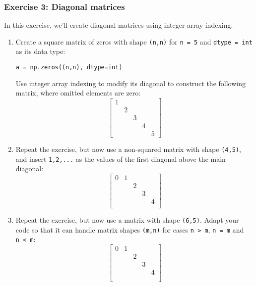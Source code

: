 \documentclass[10pt]{scrartcl}
\begin{document}
    \hypertarget{exercise-3-diagonal-matrices}{%
\subsubsection{Exercise 3: Diagonal
matrices}\label{exercise-3-diagonal-matrices}}

In this exercise, we'll create diagonal matrices using integer array
indexing.

\begin{enumerate}
\def\labelenumi{\arabic{enumi}.}
\item
  Create a square matrix of zeros with shape \texttt{(n,n)} for
  \texttt{n\ =\ 5} and \texttt{dtype\ =\ int} as its data type:

\begin{verbatim}
a = np.zeros((n,n), dtype=int)
\end{verbatim}

  Use integer array indexing to modify its diagonal to construct the
  following matrix, where omitted elements are zero: \[
  \begin{bmatrix}
  1 &   &   &   & \\
    & 2 &   &   & \\
    &   & 3 &   & \\
    &   &   & 4 & \\
    &   &   &   & 5     
  \end{bmatrix}
  \]
\item
  Repeat the exercise, but now use a non-squared matrix with shape
  \texttt{(4,5)}, and insert \texttt{1,2,...} as the values of the first
  diagonal above the main diagonal: \[
  \begin{bmatrix}
   0 & 1 &   &   &   \\
   &   & 2 &   &   \\
   &   &   & 3 &   \\
   &   &   &   & 4 \\
  \end{bmatrix}
  \]
\item
  Repeat the exercise, but now use a matrix with shape \texttt{(6,5)}.
  Adapt your code so that it can handle matrix shapes \texttt{(m,n)} for
  cases \texttt{n\ \textgreater{}\ m}, \texttt{n\ =\ m} and
  \texttt{n\ \textless{}\ m}: \[
  \begin{bmatrix}
   0 & 1 &   &   &   \\
   &   & 2 &   &   \\
   &   &   & 3 &   \\
   &   &   &   & 4 \\
   &&&& \\
   &&&&
  \end{bmatrix}
  \]
\end{enumerate}
\end{document}
